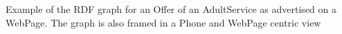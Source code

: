 \centering
\label{fig:ldviews}
Example of the RDF graph for an Offer of an AdultService as advertised on a WebPage.  The graph is also framed in a Phone and WebPage centric view 
\vspace{-0.2cm}
